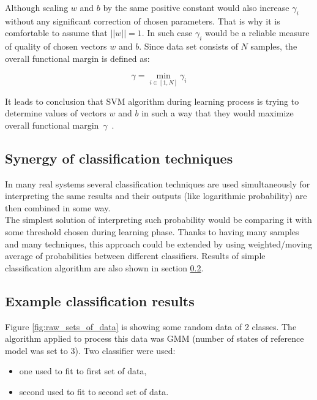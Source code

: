 \documentclass[magister]{dyplom}
\begin{document}
	Although scaling $w$ and $b$ by the same positive constant would also increase $\gamma_i$ without any significant correction of chosen parameters. That is why it is comfortable to assume that \mbox{$||w|| = 1$}. In such case $\gamma_i$ would be a reliable measure of quality of chosen vectors $w$ and $b$. Since data set consists of $N$ samples, the overall functional margin is defined as:
	
	\begin{equation}
		\gamma = \min_{i \in [1,N]} \gamma_i
	\end{equation}
	
	It leads to conclusion that \gls{SVM} algorithm during learning process is trying to determine values of vectors $w$ and $b$ in such a way that they would maximize overall functional \mbox{margin $\gamma$ \cite{SVM_tutorial}}.

	\subsection{Synergy of classification techniques}
	
	In many real systems several classification techniques are used simultaneously for interpreting the same results and their outputs (like logarithmic probability) are then combined in some way. \\
	
	The simplest solution of interpreting such probability would be comparing it with some threshold chosen during learning phase. Thanks to having many samples and many techniques, this approach could be extended by using weighted/moving average of probabilities between different classifiers. Results of simple classification algorithm are also shown in section \ref{sec:example_classification}.
	
	\subsection{Example classification results} \label{sec:example_classification}
	
	Figure \ref{fig:raw_sets_of_data} is showing some random data of 2 classes. The algorithm applied to process this data was \gls{GMM} (number of states of reference model was set to 3). Two classifier were used:
	
	\begin{itemize}
		\item one used to fit to first set of data,
		\item second used to fit to second set of data.
	\end{itemize}
	
\end{document}
